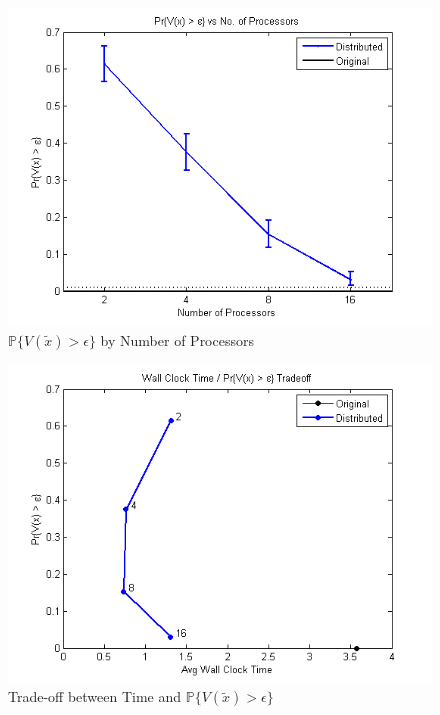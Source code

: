 \documentclass[12pt]{article}
\begin{document}
\begin{figure}[ht]
	\centering
		\includegraphics{../plot/figs/probviolprobgreateps_numproc.png}
	\caption{$\mathbb{P}\{V(\tilde{x}) > \epsilon \}$ by Number of Processors}
	\label{fig:probviolprobgreateps_numproc}
\end{figure}

\begin{figure}[ht]
	\centering
		\includegraphics{../plot/figs/wct_probviolprobgreateps_frontier.png}
	\caption{Trade-off between Time and $\mathbb{P}\{V(\tilde{x}) > \epsilon \}$}
	\label{fig:wct_probviolprobgreateps_frontier}
\end{figure}
\end{document}
